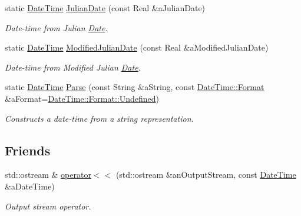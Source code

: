\begin{DoxyCompactItemize}
static \hyperlink{classlibrary_1_1physics_1_1time_1_1_date_time}{Date\+Time} \hyperlink{classlibrary_1_1physics_1_1time_1_1_date_time_a1a8238109f35a9c96d8c0038b41f1c27}{Julian\+Date} (const Real \&a\+Julian\+Date)
\begin{DoxyCompactList}\small\item\em Date-\/time from Julian \hyperlink{classlibrary_1_1physics_1_1time_1_1_date}{Date}. \end{DoxyCompactList}\item 
static \hyperlink{classlibrary_1_1physics_1_1time_1_1_date_time}{Date\+Time} \hyperlink{classlibrary_1_1physics_1_1time_1_1_date_time_aa403adb642d299481fda591b93553bbc}{Modified\+Julian\+Date} (const Real \&a\+Modified\+Julian\+Date)
\begin{DoxyCompactList}\small\item\em Date-\/time from Modified Julian \hyperlink{classlibrary_1_1physics_1_1time_1_1_date}{Date}. \end{DoxyCompactList}\item 
static \hyperlink{classlibrary_1_1physics_1_1time_1_1_date_time}{Date\+Time} \hyperlink{classlibrary_1_1physics_1_1time_1_1_date_time_ae14e7677611cf32f61e57a874d31c0be}{Parse} (const String \&a\+String, const \hyperlink{classlibrary_1_1physics_1_1time_1_1_date_time_a99e6afd988c9b091b1540d707922c804}{Date\+Time\+::\+Format} \&a\+Format=\hyperlink{classlibrary_1_1physics_1_1time_1_1_date_time_a99e6afd988c9b091b1540d707922c804aec0fc0100c4fc1ce4eea230c3dc10360}{Date\+Time\+::\+Format\+::\+Undefined})
\begin{DoxyCompactList}\small\item\em Constructs a date-\/time from a string representation. \end{DoxyCompactList}\end{DoxyCompactItemize}
\subsection*{Friends}
\begin{DoxyCompactItemize}
\item 
std\+::ostream \& \hyperlink{classlibrary_1_1physics_1_1time_1_1_date_time_afd7a10118810d4133db2044ddbb7e001}{operator$<$$<$} (std\+::ostream \&an\+Output\+Stream, const \hyperlink{classlibrary_1_1physics_1_1time_1_1_date_time}{Date\+Time} \&a\+Date\+Time)
\begin{DoxyCompactList}\small\item\em Output stream operator. \end{DoxyCompactList}\end{DoxyCompactItemize}


